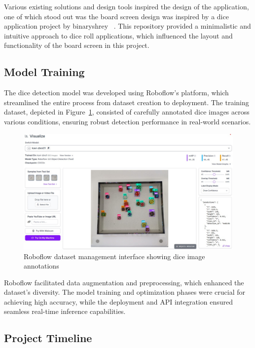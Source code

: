 Various existing solutions and design tools inspired the design of the application, one of which stood out was the board screen design was inspired by a dice application project by binaryshrey ~\cite{bib:binaryshrey}. This repository provided a minimalistic and intuitive approach to dice roll applications, which influenced the layout and functionality of the board screen in this project.

\subsection{Model Training}

The dice detection model was developed using Roboflow's platform, which streamlined the entire process from dataset creation to deployment. The training dataset, depicted in Figure~\ref{fig:roboflow_dataset}, consisted of carefully annotated dice images across various conditions, ensuring robust detection performance in real-world scenarios.

\begin{figure}[h]
    \centering
    \includegraphics[width=\textwidth]{img/roboflow_dataset.jpg}
    \caption{Roboflow dataset management interface showing dice image annotations}
    \label{fig:roboflow_dataset}
\end{figure}

Roboflow facilitated data augmentation and preprocessing, which enhanced the dataset's diversity. The model training and optimization phases were crucial for achieving high accuracy, while the deployment and API integration ensured seamless real-time inference capabilities.

\subsection{Project Timeline}

